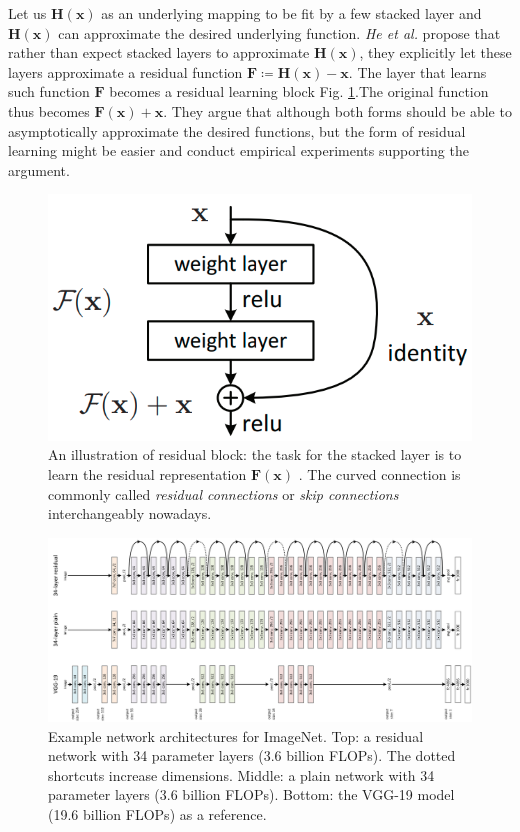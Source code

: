     Let us $\mathbf{H(x)}$ as an underlying mapping to be fit by a few stacked layer and $\mathbf{H(x)}$ can approximate the desired underlying function. \textit{He et al.} \cite{He2016Resnet} propose that rather than expect stacked layers to approximate $\mathbf{H(x)}$, they explicitly let these layers approximate a residual function $\mathbf{F} \coloneqq \mathbf{H(x)-x}$. The layer that learns such function $\mathbf{F}$ becomes a residual learning block Fig. \ref{fig:ch2-residual-learning-block}.The original function thus becomes $\mathbf{F(x)+x}$. They argue that although both forms should be able to asymptotically approximate the desired functions, but the form of residual learning might be easier and conduct empirical experiments supporting the argument.
    \begin{figure}
    	\centering
    	\includegraphics[width=0.5\columnwidth]{figures/ch2/residual-learning-block.png}
    	\caption{An illustration of residual block: the task for the stacked layer is to learn the residual representation $\mathbf{F(x)}$ \cite{He2016Resnet}. The curved connection is commonly called \textit{residual connections} or \textit{skip connections} interchangeably nowadays.} 
    	\label{fig:ch2-residual-learning-block}
    \end{figure}

\begin{figure}
	\centering
	\includegraphics[width=0.8\columnwidth]{figures/ch2/resnet-architecture.jpeg}
	\caption{Example network architectures for ImageNet. 
		Top: a residual network with 34 parameter layers (3.6 billion
		FLOPs). The dotted shortcuts increase dimensions.
		Middle: a plain network with 34 parameter layers (3.6 billion FLOPs).
		Bottom: the
		VGG-19 model \cite{Simonyan15vggnets} (19.6 billion FLOPs) as a reference. \cite{He2016Resnet}} 
	\label{fig:ch2-resnet-architecture}
\end{figure}

